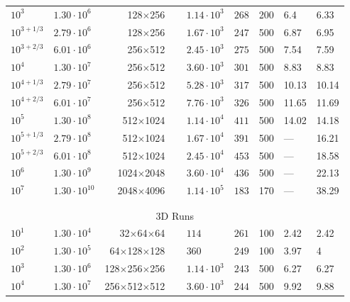 \documentclass[aps, pre, onecolumn, nofootinbib, notitlepage, groupedaddress, amsfonts, amssymb, amsmath, longbibliography]{revtex4-1}
\begin{document}
\begin{table}
\begin{center}
\begin{tabularx}{\textwidth}{ X X r | X X X | X X }
$10^3$	        &	$1.30 \cdot 10^6$       &	128$\times$256$\,\,\,\,\,\,\,$&	$1.14 \cdot 10^3$	&	$268$	&	200	&	6.4	&	6.33	\\
$10^{3 + 1/3}$	&	$2.79 \cdot 10^6$       &	128$\times$256$\,\,\,\,\,\,\,$&	$1.67 \cdot 10^3$	&	$247$	&	500	&	6.87	&	6.95	\\
$10^{3 + 2/3}$	&	$6.01 \cdot 10^6$       &	256$\times$512$\,\,\,\,\,\,\,$&	$2.45 \cdot 10^3$	&	$275$	&	500	&	7.54	&	7.59	\\
$10^4$	        &	$1.30 \cdot 10^7$       &	256$\times$512$\,\,\,\,\,\,\,$&	$3.60 \cdot 10^3$	&	$301$	&	500	&	8.83	&	8.83	\\
$10^{4 + 1/3}$	&	$2.79 \cdot 10^7$       &	256$\times$512$\,\,\,\,\,\,\,$&	$5.28 \cdot 10^3$	&	$317$	&	500	&	10.13	&	10.14	\\
$10^{4 + 2/3}$	&	$6.01 \cdot 10^7$       &	256$\times$512$\,\,\,\,\,\,\,$&	$7.76 \cdot 10^3$	&	$326$	&	500	&	11.65	&	11.69	\\
$10^5$	        &	$1.30 \cdot 10^8$       &	512$\times$1024$\,\,\,\,\,\,\,$&	$1.14 \cdot 10^4$	&	$411$	&	500	&	14.02	&	14.18	\\
$10^{5 + 1/3}$	&	$2.79 \cdot 10^8$       &	512$\times$1024$\,\,\,\,\,\,\,$&	$1.67 \cdot 10^4$	&	$391$	&	500	&	---	&	16.21	\\
$10^{5 + 2/3}$	&	$6.01 \cdot 10^8$       &	512$\times$1024$\,\,\,\,\,\,\,$&	$2.45 \cdot 10^4$	&	$453$	&	500	&	---	&	18.58	\\
$10^6$	        &	$1.30 \cdot 10^9$       &	1024$\times$2048$\,\,\,\,\,\,\,$	&	$3.60 \cdot 10^4$	&	$436$	&	500	&	---	&	22.13	\\
$10^7$	        &	$1.30 \cdot 10^{10}$	&	2048$\times$4096$\,\,\,\,\,\,\,$	&	$1.14 \cdot 10^5$	&	$183$	&	170	&	---	&	38.29	\\
\\ \hline \hline \multicolumn{8}{c}{\vspace{-0.2cm}}\\
\multicolumn{8}{c}{\vspace{0.1cm}3D Runs} \\
\hline
$10^1$          &	$1.30 \cdot 10^4$	&	32$\times$64$\times$64$\,\,\,\,\,\,\,$   &	$114$	&	$261$	&	100	&	2.42	&	2.42	\\
$10^2$          &	$1.30 \cdot 10^5$	&	64$\times$128$\times$128$\,\,\,\,\,\,\,$   &	$360$	&	$249$	&	100	&	3.97	&	4	\\
$10^3$          &	$1.30 \cdot 10^6$	&	128$\times$256$\times$256$\,\,\,\,\,\,\,$	&	$1.14 \cdot 10^3$	&	$243$	&	500	&	6.27	&	6.27	\\
$10^4$          &	$1.30 \cdot 10^7$	&	256$\times$512$\times$512$\,\,\,\,\,\,\,$	&	$3.60 \cdot 10^3$	&	$244$	&	500	&	9.92	&	9.88	\\
\hline																	
\end{tabularx}
\end{center}
\end{table}
\end{document}
